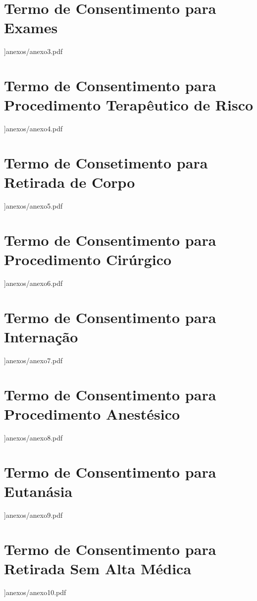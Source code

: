 \begin{anexosenv}
\chapter{Termo de Consentimento para Exames}
{}]{anexos/anexo3.pdf}

\chapter{Termo de Consentimento para Procedimento Terapêutico de Risco}
{}]{anexos/anexo4.pdf}

\chapter{Termo de Consetimento para Retirada de Corpo}
{}]{anexos/anexo5.pdf}

\chapter{Termo de Consentimento para Procedimento Cirúrgico}
{}]{anexos/anexo6.pdf}

\chapter{Termo de Consentimento para Internação}
{}]{anexos/anexo7.pdf}

\chapter{Termo de Consentimento para Procedimento Anestésico}
{}]{anexos/anexo8.pdf}

\chapter{Termo de Consentimento para Eutanásia}
{}]{anexos/anexo9.pdf}

\chapter{Termo de Consentimento para Retirada Sem Alta Médica}
{}]{anexos/anexo10.pdf}


\end{anexosenv}
